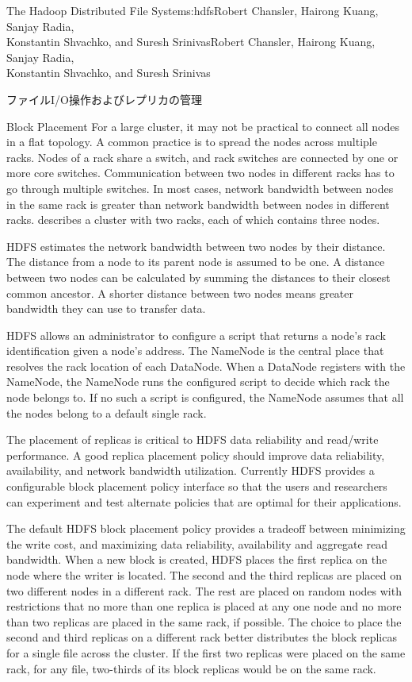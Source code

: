 \begin{aosachaptertoc}{The Hadoop Distributed File System}{s:hdfs}{Robert Chansler, Hairong Kuang, Sanjay Radia, \\ Konstantin Shvachko, and Suresh Srinivas}{Robert Chansler, Hairong Kuang, Sanjay Radia, \\ \hspace*{0.9cm} Konstantin Shvachko, and Suresh Srinivas}
\begin{aosasect1}{ファイルI/O操作およびレプリカの管理}
\begin{aosasect2}{Block Placement}
For a large cluster, it may not be practical to connect all nodes in a
flat topology. A common practice is to spread the nodes across
multiple racks. Nodes of a rack share a switch, and rack switches are
connected by one or more core switches. Communication between two
nodes in different racks has to go through multiple switches. In most
cases, network bandwidth between nodes in the same rack is greater
than network bandwidth between nodes in different racks.
 describes a cluster with two racks, each of
which contains three nodes.


HDFS estimates the network bandwidth between two nodes by their
distance. The distance from a node to its parent node is assumed to be
one. A distance between two nodes can be calculated by summing the
distances to their closest common ancestor.  A shorter distance
between two nodes means greater bandwidth they can use to transfer
data.

HDFS allows an administrator to configure a script that returns a
node's rack identification given a node's address. The NameNode is the
central place that resolves the rack location of each DataNode. When a
DataNode registers with the NameNode, the NameNode runs the configured
script to decide which rack the node belongs to. If no such a script
is configured, the NameNode assumes that all the nodes belong to a
default single rack.

The placement of replicas is critical to HDFS data reliability and
read/write performance. A good replica placement policy should improve
data reliability, availability, and network bandwidth
utilization. Currently HDFS provides a configurable block placement
policy interface so that the users and researchers can experiment and
test alternate policies that are optimal for their applications.

The default HDFS block placement policy provides a tradeoff between
minimizing the write cost, and maximizing data reliability,
availability and aggregate read bandwidth. When a new block is
created, HDFS places the first replica on the node where the writer is
located. The second and the third replicas are placed on two different
nodes in a different rack. The rest are placed on random nodes with
restrictions that no more than one replica is placed at any one node
and no more than two replicas are placed in the same rack, if
possible. The choice to place the second and third replicas on a
different rack better distributes the block replicas for a single file
across the cluster. If the first two replicas were placed on the same
rack, for any file, two-thirds of its block replicas would be on the
same rack.


\end{aosasect2}
\end{aosasect1}
\end{aosachaptertoc}
